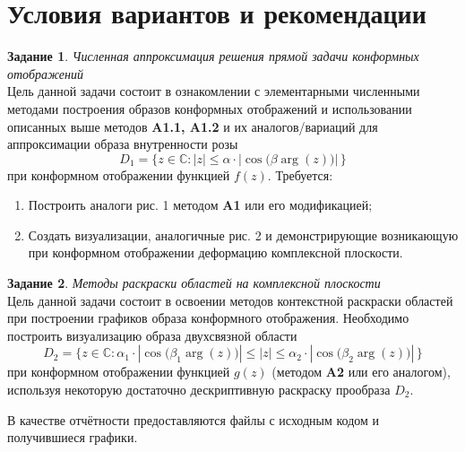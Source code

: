 \documentclass{article}
\theoremstyle{definition}
\newtheorem{task}{Задание}
\begin{document}
\section{Условия вариантов и рекомендации}
\begin{task}
\textit{Численная аппроксимация решения прямой задачи конформных отображений} \\
Цель данной задачи состоит в ознакомлении с элементарными численными методами построения образов конформных отображений и использовании описанных выше методов \textbf{A1.1, A1.2} и их аналогов/вариаций для аппроксимации образа внутренности розы
\begin{equation*}
D_1 = \bigl\{ z\in\mathbb{C}: |z|\leq \alpha\cdot |\cos\bigl(\beta \arg(z)\bigr)|\, \bigr\}
\end{equation*} при конформном отображении функцией $f(z)$. Требуется:
\begin{enumerate}
\item Построить аналоги рис. 1 методом \textbf{A1} или его модификацией;
\item Создать визуализации, аналогичные рис. 2 и демонстрирующие возникающую при конформном отображении деформацию комплексной плоскости.
\end{enumerate}
\end{task} \vspace{0.1cm}
\begin{task}
\textit{Методы раскраски областей на комплексной плоскости} \\
Цель данной задачи состоит в освоении методов контекстной раскраски областей при построении графиков образа конформного отображения. Необходимо построить визуализацию образа двухсвязной области 
\begin{equation*}
D_2 = \bigl\{ z\in\mathbb{C}: \alpha_1\cdot |\cos\bigl(\beta_1 \arg(z)\bigr)| \leq 
|z|\leq \alpha_2\cdot |\cos\bigl(\beta_2 \arg(z)\bigr)|\, \bigr\}
\end{equation*} при конформном отображении функцией $g(z)$ (методом \textbf{A2} или его аналогом), используя некоторую достаточно дескриптивную раскраску прообраза $D_2$.
\end{task}
В качестве отчётности предоставляются файлы с исходным кодом и получившиеся графики.
\vspace{0.6cm}
\renewcommand*{\arraystretch}{1.8}
\end{document}
